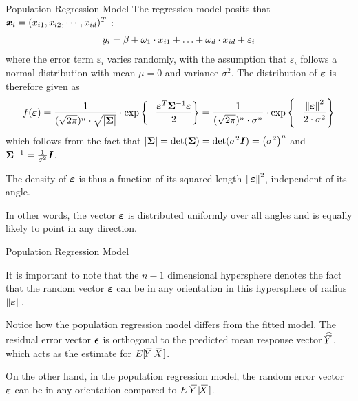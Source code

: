 %
\begin{frame}{Population Regression Model}
The regression model posits that %
${\boldsymbol x}_i = (x_{i1}, x_{i2}, \cdots, x_{id})^T$ :
\begin{align*}
y_i = \beta + \omega_1 \cdot x_{i1} + \ldots + \omega_d \cdot x_{id} + \varepsilon_i
\end{align*}
where the %
error term $\varepsilon_i$ varies randomly, with the
assumption that $\varepsilon_i$ follows a normal distribution with mean
$\mu= 0$ and variance $\sigma^2$. 
The distribution of ${\bm \varepsilon}$ is therefore given as
\begin{align*}
    f({\bm \varepsilon}) = \frac{1}{(\sqrt{2\pi})^n \cdot \sqrt{|{\bm \Sigma}|}} \cdot 
    \exp \left\{ -\frac{{\bm \varepsilon}^T {\bm \Sigma}^{-1} {\bm \varepsilon}}{2} \right\} =
\frac{1}{(\sqrt{2\pi})^n \cdot \sigma^n} \cdot 
\exp \left\{ -\frac{\left\lVert{\bm \varepsilon}\right\rVert^2}{2 \cdot \sigma^2} \right\}
\end{align*}
which follows from the fact that $|{\bm \Sigma}| = \det({\bm \Sigma}) = \det(\sigma^2 {\boldsymbol I}) =
\left(\sigma^2\right)^n$ and ${\bm \Sigma}^{-1} = \frac{1}{\sigma^2} {\boldsymbol I}$.

\medskip


The density of ${\bm \varepsilon}$ is thus a function of its
squared length $\left\lVert{\bm \varepsilon}\right\rVert^2$, independent of its angle. 

\medskip

In other words, the vector ${\bm \varepsilon}$ is distributed uniformly over
all angles and is equally likely to point in any direction. 

\end{frame}
\begin{frame}{Population Regression Model}

It is important to note that the $n-1$ dimensional hypersphere denotes
the fact that the random vector ${\bm \varepsilon}$ can be in any orientation in this
hypersphere of radius $\left\lVert{\bm \varepsilon}\right\rVert$.

\medskip

Notice how the population regression model differs from the fitted
model. 
The residual error vector ${\bm \epsilon}$ is
orthogonal to the predicted mean response vector $\widehat{\mkern 1.5mu\overline{\mkern-4.0muY}\mkern 1.5mu}$, which 
acts as the estimate for $E[\mkern 1.5mu\overline{\mkern-4.0muY}\mkern 1.5mu|\mkern 1.5mu\overline{\mkern-4.0muX}\mkern 1.5mu]$. 

\medskip

On the other hand, in the population regression model, 
the random error vector ${\bm \varepsilon}$ can be in any
orientation compared to $E[\mkern 1.5mu\overline{\mkern-4.0muY}\mkern 1.5mu|\mkern 1.5mu\overline{\mkern-4.0muX}\mkern 1.5mu]$.
\end{frame}
